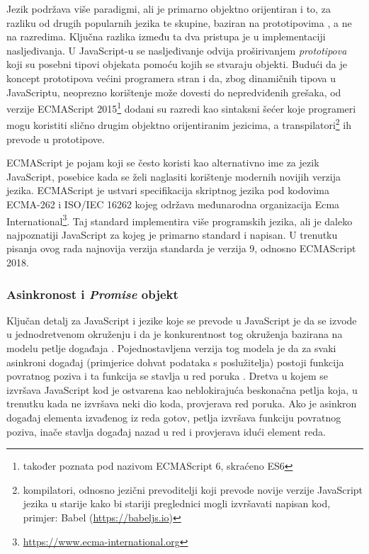 \documentclass[times, utf8, diplomski, numeric]{fer}
\newcommand{\razmakp}{\vspace{18pt}}
\newcommand{\razmaks}{\vspace{10pt}}
\begin{document}
Jezik podržava više paradigmi, ali je primarno objektno orijentiran i to, za razliku od drugih popularnih jezika te skupine, baziran na prototipovima , a ne na razredima.
Ključna razlika između ta dva pristupa je u implementaciji nasljeđivanja. U JavaScript-u se nasljeđivanje odvija proširivanjem \emph{prototipova} koji su posebni tipovi objekata pomoću kojih se stvaraju objekti.\citep{wiki_proto_prog}
Budući da je koncept prototipova većini programera stran i da, zbog dinamičnih tipova u JavaScriptu, neoprezno korištenje može dovesti do nepredviđenih grešaka, od verzije ECMAScript 2015\footnote{
    također poznata pod nazivom ECMAScript 6, skraćeno ES6
} dodani su razredi kao sintaksni šećer  koje programeri mogu koristiti slično drugim objektno orijentiranim jezicima, a transpilatori\footnote{
    kompilatori, odnosno jezični prevoditelji koji prevode novije verzije JavaScript jezika u starije kako bi stariji preglednici mogli izvršavati napisan kod, primjer: Babel (\url{https://babeljs.io})
} ih prevode u prototipove\citep{mdn_class}.

\razmakp

ECMAScript je pojam koji se često koristi kao alternativno ime za jezik JavaScript, posebice kada se želi naglasiti korištenje modernih novijih verzija jezika.
ECMAScript je ustvari specifikacija skriptnog jezika pod kodovima ECMA-262 i ISO/IEC 16262 kojeg održava međunarodna organizacija Ecma International\footnote{\url{https://www.ecma-international.org}}.
Taj standard implementira više programskih jezika, ali je daleko najpoznatiji JavaScript za kojeg je primarno standard i napisan.
U trenutku pisanja ovog rada najnovija verzija standarda je verzija 9, odnosno ECMAScript 2018.\citep{wiki_es}

\razmaks
\subsubsection{Asinkronost i \emph{Promise} objekt} \label{sec:async}

Ključan detalj za JavaScript i jezike koje se prevode u JavaScript je da se izvode u jednodretvenom okruženju i da je konkurentnost tog okruženja bazirana na modelu petlje događaja .
Pojednostavljena verzija tog modela je da za svaki asinkroni događaj (primjerice dohvat podataka s poslužitelja) postoji funkcija povratnog poziva  i ta funkcija se stavlja u red poruka .
Dretva u kojem se izvršava JavaScript kod je ostvarena kao neblokirajuća beskonačna petlja koja, u trenutku kada ne izvršava neki dio koda, provjerava red poruka.
Ako je asinkron događaj elementa izvađenog iz reda gotov, petlja izvršava funkciju povratnog poziva, inače stavlja događaj nazad u red i provjerava idući element reda.\citep{mdn_event_loop}
\end{document}
